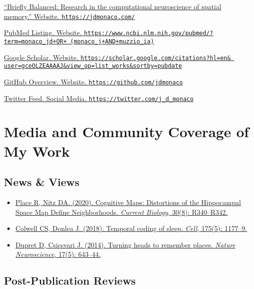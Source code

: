 \documentclass[10pt]{article}
\newcommand{\itemtitle}[1]{{\color{hopkinsblue}\ul{#1}}}
\newcommand{\aurl}[1]{{\color{dimgray}\texttt{#1}}}
\begin{document}
\begin{description}
  \item \href{https://jdmonaco.com/}
    {``\itemtitle{Briefly Balanced: Research in the computational neuroscience
    of spatial memory}.” Website. \aurl{https://jdmonaco.com/}}
  \item \href{https://www.ncbi.nlm.nih.gov/pubmed/?term=monaco_jd+OR+(monaco_j+AND+muzzio_ia)}
    {\itemtitle{PubMed Listing}. Website. \aurl{https://www.ncbi.nlm.nih.gov/pubmed/?term=monaco\_jd+OR+ (monaco\_j+AND+muzzio\_ia)}}
  \item \href{http://jdmonaco.com/google-scholar}
    {\itemtitle{Google Scholar}. Website. \aurl{https://scholar.google.com/citations?hl=en\& user=gceOLZEAAAAJ\&view\_op=list\_works\&sortby=pubdate}}
  \item \href{https://github.com/jdmonaco}
    {\itemtitle{GitHub Overview}. Website. \aurl{https://github.com/jdmonaco}}
  \item \href{https://twitter.com/j_d_monaco}
    {\itemtitle{Twitter Feed}. Social Media. \aurl{https://twitter.com/j\_d\_monaco}}
\end{description}

\section*{Media and Community Coverage of My Work}

\subsection*{News \& Views}

\begin{itemize}
  \item \href{https://doi.org/10.1016/j.cub.2020.02.085}
    {Place R, Nitz DA. (2020). \itemtitle{Cognitive Maps: Distortions of the Hippocampal 
      Space Map Define Neighborhoods}. \emph{Current Biology}, 30(8): R340--R342.}
  \item \href{https://doi.org/10.1016/j.cell.2018.10.047}
    {Colwell CS, Donlea J. (2018). \itemtitle{Temporal coding of sleep}. \emph{Cell}, 175(5): 1177--9.}
  \item \href{https://doi.org/10.1038/nn.3700}
    {Dupret D, Csicsvari J. (2014). \itemtitle{Turning heads to remember
    places}. \emph{Nature Neuroscience}, 17(5): 643--44.}
\end{itemize}

\subsection*{Post-Publication Reviews}
\end{document}

